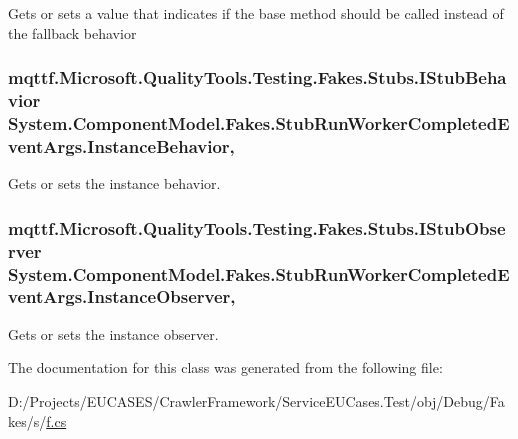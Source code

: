 Gets or sets a value that indicates if the base method should be called instead of the fallback behavior

\hypertarget{class_system_1_1_component_model_1_1_fakes_1_1_stub_run_worker_completed_event_args_ab02a455079bf132e6916184dbf3db119}{
\subsubsection[{Instance\-Behavior}]{\setlength{\rightskip}{0pt plus 5cm}mqttf.\-Microsoft.\-Quality\-Tools.\-Testing.\-Fakes.\-Stubs.\-I\-Stub\-Behavior System.\-Component\-Model.\-Fakes.\-Stub\-Run\-Worker\-Completed\-Event\-Args.\-Instance\-Behavior\hspace{0.3cm}{\ttfamily [get]}, {\ttfamily [set]}}}\label{class_system_1_1_component_model_1_1_fakes_1_1_stub_run_worker_completed_event_args_ab02a455079bf132e6916184dbf3db119}


Gets or sets the instance behavior.

\hypertarget{class_system_1_1_component_model_1_1_fakes_1_1_stub_run_worker_completed_event_args_aeb12ebb9d15ef70d9f90957df1c2278b}{
\subsubsection[{Instance\-Observer}]{\setlength{\rightskip}{0pt plus 5cm}mqttf.\-Microsoft.\-Quality\-Tools.\-Testing.\-Fakes.\-Stubs.\-I\-Stub\-Observer System.\-Component\-Model.\-Fakes.\-Stub\-Run\-Worker\-Completed\-Event\-Args.\-Instance\-Observer\hspace{0.3cm}{\ttfamily [get]}, {\ttfamily [set]}}}\label{class_system_1_1_component_model_1_1_fakes_1_1_stub_run_worker_completed_event_args_aeb12ebb9d15ef70d9f90957df1c2278b}


Gets or sets the instance observer.



The documentation for this class was generated from the following file\-:\begin{DoxyCompactItemize}
\item 
D\-:/\-Projects/\-E\-U\-C\-A\-S\-E\-S/\-Crawler\-Framework/\-Service\-E\-U\-Cases.\-Test/obj/\-Debug/\-Fakes/s/\hyperlink{s_2f_8cs}{f.\-cs}\end{DoxyCompactItemize}
